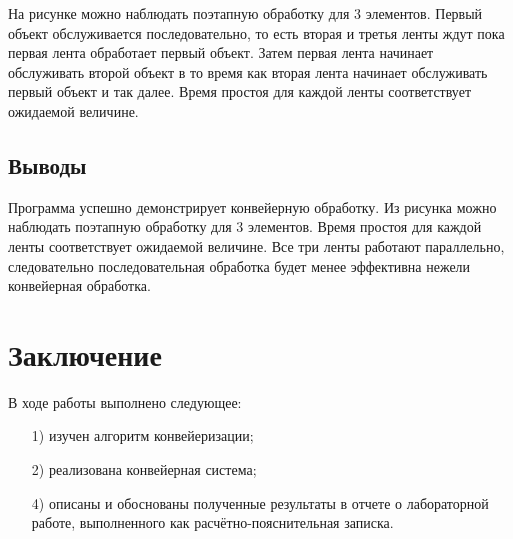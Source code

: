 \documentclass[a4paper,12pt]{article}
\begin{document}
На рисунке можно наблюдать поэтапную обработку
для 3 элементов. Первый объект обслуживается последовательно, то есть вторая и третья ленты ждут пока первая лента обработает первый объект. Затем первая лента начинает обслуживать второй объект в то время как вторая лента начинает обслуживать первый объект и так далее.
Время простоя для каждой ленты
соответствует ожидаемой величине.


\subsection*{Выводы}

Программа успешно демонстрирует конвейерную обработку.
Из рисунка можно наблюдать поэтапную обработку для 3 элементов. Время простоя для каждой ленты соответствует ожидаемой величине. Все три ленты работают параллельно, следовательно последовательная обработка будет менее эффективна нежели конвейерная обработка.

\section*{Заключение}

В ходе работы выполнено следующее:

\begin{enumerate} 
	\item[1)] изучен алгоритм конвейеризации;
	\item[2)] реализована конвейерная система;
	\item[4)] описаны и обоснованы полученные результаты в отчете о лабораторной 
	работе, выполненного как расчётно-пояснительная записка. 
\end{enumerate}
\end{document}
